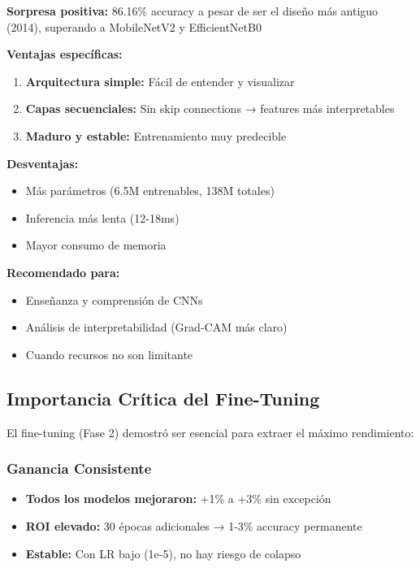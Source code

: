 \documentclass[11pt, a4paper]{article}
\begin{document}
\textbf{Sorpresa positiva:} 86.16\% accuracy a pesar de ser el diseño más antiguo (2014), superando a MobileNetV2 y EfficientNetB0

\textbf{Ventajas específicas:}

\begin{enumerate}
    \item \textbf{Arquitectura simple:} Fácil de entender y visualizar
    \item \textbf{Capas secuenciales:} Sin skip connections → features más interpretables
    \item \textbf{Maduro y estable:} Entrenamiento muy predecible
\end{enumerate}

\textbf{Desventajas:}
\begin{itemize}
    \item Más parámetros (6.5M entrenables, 138M totales)
    \item Inferencia más lenta (12-18ms)
    \item Mayor consumo de memoria
\end{itemize}

\textbf{Recomendado para:}
\begin{itemize}
    \item Enseñanza y comprensión de CNNs
    \item Análisis de interpretabilidad (Grad-CAM más claro)
    \item Cuando recursos no son limitante
\end{itemize}

\subsection{Importancia Crítica del Fine-Tuning}

El fine-tuning (Fase 2) demostró ser esencial para extraer el máximo rendimiento:

\subsubsection{Ganancia Consistente}

\begin{itemize}
    \item \textbf{Todos los modelos mejoraron:} +1\% a +3\% sin excepción
    \item \textbf{ROI elevado:} 30 épocas adicionales → 1-3\% accuracy permanente
    \item \textbf{Estable:} Con LR bajo (1e-5), no hay riesgo de colapso
\end{itemize}
\end{document}
